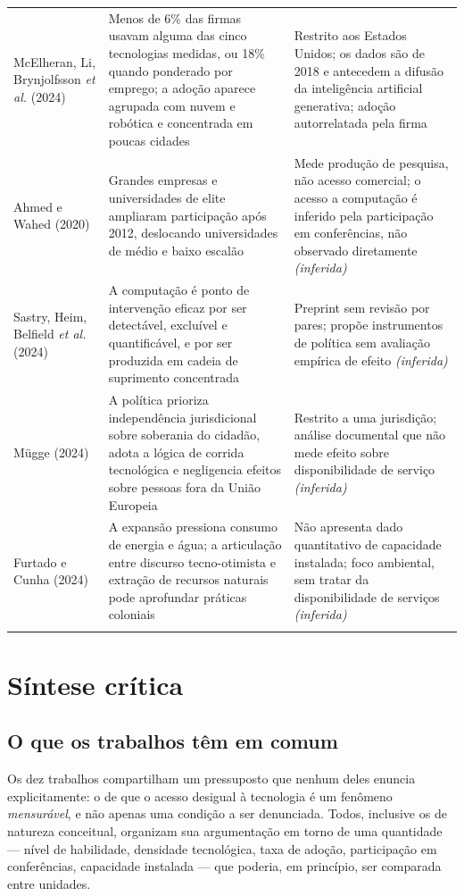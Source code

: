 \documentclass[12pt,a4paper]{article}
\begin{document}
\begin{longtable}{@{}p{2.4cm} p{6.0cm} p{6.0cm}@{}}
\addlinespace
McElheran, Li, Brynjolfsson \emph{et al.} (2024) & Menos de 6\% das firmas usavam alguma das cinco tecnologias medidas, ou 18\% quando ponderado por emprego; a adoção aparece agrupada com nuvem e robótica e concentrada em poucas cidades & Restrito aos Estados Unidos; os dados são de 2018 e antecedem a difusão da inteligência artificial generativa; adoção autorrelatada pela firma \\
\addlinespace
Ahmed e Wahed (2020) & Grandes empresas e universidades de elite ampliaram participação após 2012, deslocando universidades de médio e baixo escalão & Mede produção de pesquisa, não acesso comercial; o acesso a computação é inferido pela participação em conferências, não observado diretamente \emph{(inferida)} \\
\addlinespace
Sastry, Heim, Belfield \emph{et al.} (2024) & A computação é ponto de intervenção eficaz por ser detectável, excluível e quantificável, e por ser produzida em cadeia de suprimento concentrada & Preprint sem revisão por pares; propõe instrumentos de política sem avaliação empírica de efeito \emph{(inferida)} \\
\addlinespace
Mügge (2024) & A política prioriza independência jurisdicional sobre soberania do cidadão, adota a lógica de corrida tecnológica e negligencia efeitos sobre pessoas fora da União Europeia & Restrito a uma jurisdição; análise documental que não mede efeito sobre disponibilidade de serviço \emph{(inferida)} \\
\addlinespace
Furtado e Cunha (2024) & A expansão pressiona consumo de energia e água; a articulação entre discurso tecno-otimista e extração de recursos naturais pode aprofundar práticas coloniais & Não apresenta dado quantitativo de capacidade instalada; foco ambiental, sem tratar da disponibilidade de serviços \emph{(inferida)} \\
\addlinespace
\end{longtable}
\normalsize

\section{Síntese crítica}

\subsection{O que os trabalhos têm em comum}

Os dez trabalhos compartilham um pressuposto que nenhum deles enuncia explicitamente:
o de que o acesso desigual à tecnologia é um fenômeno \emph{mensurável}, e não apenas
uma condição a ser denunciada. Todos, inclusive os de natureza conceitual, organizam
sua argumentação em torno de uma quantidade --- nível de habilidade, densidade
tecnológica, taxa de adoção, participação em conferências, capacidade instalada --- que
poderia, em princípio, ser comparada entre unidades.
\end{document}
